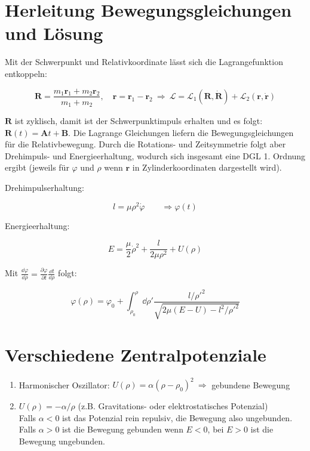 \section{Herleitung Bewegungsgleichungen und Lösung}

\begin{framedprop}
	
	Mit der Schwerpunkt und Relativkoordinate lässt sich die Lagrangefunktion entkoppeln:
	
	\[ \mathbf{R} = \frac{m_1 \mathbf{r}_1 + m_2 \mathbf{r}_2}{m_1+m_2}, \quad \mathbf{r} = \mathbf{r}_1 - \mathbf{r}_2 \ \Rightarrow \ \mathscr{L} = \mathscr{L}_1(\mathbf{R}, \mathbf{\dot R}) + \mathscr{L}_2(\mathbf{r}, \mathbf{\dot r})\]
	
	$\mathbf{R}$ ist zyklisch, damit ist der Schwerpunktimpuls erhalten und es folgt: $\mathbf{R}(t) = \mathbf{A} t + \mathbf{B}$. Die Lagrange Gleichungen liefern die Bewegungsgleichungen für die Relativbewegung. Durch die Rotations- und Zeitsymmetrie folgt aber Drehimpuls- und Energieerhaltung, wodurch sich insgesamt eine DGL 1. Ordnung ergibt (jeweils für $\varphi$ und $\rho$ wenn $\mathbf{r}$ in Zylinderkoordinaten dargestellt wird).
	
	Drehimpulserhaltung:
	
	\[ l = \mu \rho^2 \dot\varphi \qquad \Rightarrow \varphi(t)\]
	
	Energieerhaltung:
	
	\[ E = \frac{\mu}{2} \dot\rho^2 + \frac{l}{2\mu\rho^2} + U(\rho) \]
	
	Mit $\frac{\dd \varphi}{\dd \rho} = \frac{\partial \varphi}{\partial t}\frac{\dd t}{\dd \rho}$ folgt:
	
	\[ \varphi(\rho) = \varphi_0 + \int_{\rho_0}^{\rho} \dd \rho' \frac{l/\rho'^2}{\sqrt{2\mu (E-U) - l^2/\rho'^2}} \]
	
\end{framedprop}

\newpage
\section{Verschiedene Zentralpotenziale}

\begin{frameddefn}
	
	\begin{enumerate}
		\item Harmonischer Oszillator: $U(\rho) = \alpha (\rho-\rho_0)^2 \ \Rightarrow$ gebundene Bewegung
		\item $U(\rho) = - \alpha / \rho$ (z.B. Gravitations- oder elektrostatisches Potenzial)\\
		Falls $\alpha < 0$ ist das Potenzial rein repulsiv, die Bewegung also ungebunden. \\
		Falls $\alpha > 0$ ist die Bewegung gebunden wenn $E < 0$, bei $E > 0$ ist die Bewegung ungebunden.
	\end{enumerate}
	
\end{frameddefn}

